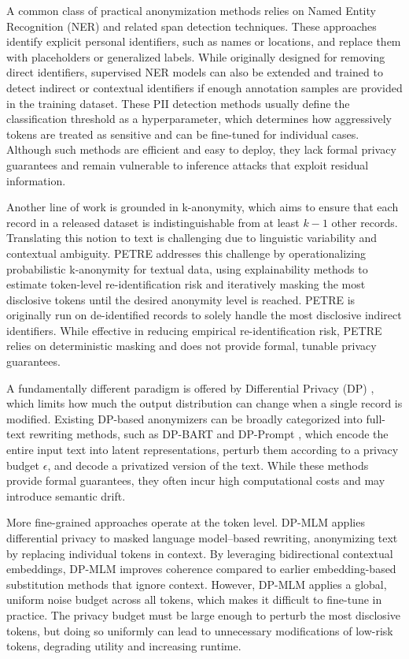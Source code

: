 \documentclass[10pt, a4paper]{article}
\begin{document}
A common class of practical anonymization methods relies on Named Entity Recognition (NER) and related span detection techniques. These approaches identify explicit personal identifiers, such as names or locations, and replace them with placeholders or generalized labels. While originally designed for removing direct identifiers, supervised NER models can also be extended and trained to detect indirect or contextual identifiers if enough annotation samples are provided in the training dataset. These PII detection methods usually define the classification threshold as a hyperparameter, which determines how aggressively tokens are treated as sensitive and can be fine-tuned for individual cases. Although such methods are efficient and easy to deploy, they lack formal privacy guarantees and remain vulnerable to inference attacks that exploit residual information.

Another line of work is grounded in k-anonymity, which aims to ensure that each record in a released dataset is indistinguishable from at least $k-1$ other records. Translating this notion to text is challenging due to linguistic variability and contextual ambiguity. PETRE \cite{manzanares-salor_enhancing_2025} addresses this challenge by operationalizing probabilistic k-anonymity for textual data, using explainability methods to estimate token-level re-identification risk and iteratively masking the most disclosive tokens until the desired anonymity level is reached. PETRE is originally run on de-identified records to solely handle the most disclosive indirect identifiers. While effective in reducing empirical re-identification risk, PETRE relies on deterministic masking and does not provide formal, tunable privacy guarantees.

A fundamentally different paradigm is offered by Differential Privacy (DP) \cite{dwork_differential_2006}, which limits how much the output distribution can change when a single record is modified. Existing DP-based anonymizers can be broadly categorized into full-text rewriting methods, such as DP-BART \cite{igamberdiev_dp-bart_2023} and DP-Prompt \cite{utpala_locally_2023}, which encode the entire input text into latent representations, perturb them according to a privacy budget $\epsilon$, and decode a privatized version of the text. While these methods provide formal guarantees, they often incur high computational costs and may introduce semantic drift.

More fine-grained approaches operate at the token level. DP-MLM \cite{meisenbacher_dp-mlm_2024} applies differential privacy to masked language model–based rewriting, anonymizing text by replacing individual tokens in context. By leveraging bidirectional contextual embeddings, DP-MLM improves coherence compared to earlier embedding-based substitution methods that ignore context. However, DP-MLM applies a global, uniform noise budget across all tokens, which makes it difficult to fine-tune in practice. The privacy budget must be large enough to perturb the most disclosive tokens, but doing so uniformly can lead to unnecessary modifications of low-risk tokens, degrading utility and increasing runtime.
\end{document}
